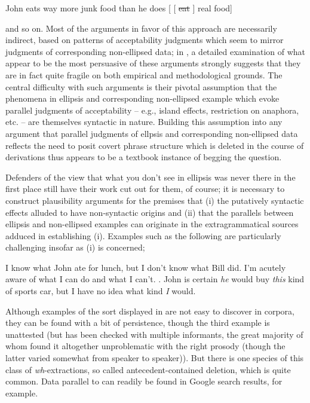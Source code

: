 \documentclass[output=paper,colorlinks,citecolor=brown]{langscibook}
\begin{document}
\begin{exe}
 \ex\label{pseudodeletion}
  John eats way more junk food than he does [ [ \sout{eat} {\gp}\xspace ] real food]
\end{exe}
\begin{sloppypar}
\noindent and so on. Most of the arguments in favor of this approach are
necessarily indirect, based on patterns of acceptability judgments which seem to
mirror judgments of corresponding non\hyp ellipsed data; in \citet{kubotalevineBook}, a
detailed examination of what appear to be the most persuasive of these
arguments strongly suggests that they are in fact quite fragile on
both empirical and methodological grounds. The central difficulty with
such arguments is their pivotal assumption  that
the phenomena in  ellipsis and corresponding non-ellipsed example
which evoke parallel judgments of acceptability -- e.g., island effects,
restriction on anaphora, etc. -- are themselves syntactic in
nature. Building this assumption into any argument that parallel
judgments of ellpsis and corresponding non-ellipsed data reflects the
need to posit covert phrase structure which is deleted in the course
of derivations thus appears to be a textbook instance of begging the question.
\end{sloppypar}

Defenders of the view that what you don't see in ellipsis was never
there in the first place still have their work cut out for them, of
course; it is necessary to construct plausibility arguments for the
premises that (i) the putatively syntactic effects alluded to have
non-syntactic origins and (ii) that the parallels between ellipsis and
non-ellipsed examples can originate in the extragrammatical sources
adduced in establishing (i). Examples such as the following are
particularly challenging insofar as (i) is concerned;


\begin{exe}
 \ex\label{extrac-from-VPE}
  \begin{xlist}
 \ex\label{extrac-from-VPE_a}
    I know what John ate for lunch,  but I don't know what Bill did.
 \ex\label{extrac-from-VPE_b}
    I'm acutely aware of what I can do and what I
  can't. \citep[735]{mahoney2004}.
 \ex\label{extrac-from-VPE_c}
    John is certain \emph{he} would buy \emph{this} kind of sports car, but I have no idea what kind \emph{I} would.
  \end{xlist}
\end{exe}
Although examples of the sort displayed in  are not
easy to discover in corpora, they can be found with a bit of
persistence, though the third example is unattested (but has been
checked with multiple informants, the great majority of whom found it
altogether unproblematic with the right prosody (though the latter
varied somewhat from speaker to speaker)). But there is one species of this class of
\textit{wh}-extractions, so called antecedent-contained deletion,  which is
quite common. Data parallel to  can readily be found in
Google search results, for example.
\end{document}
